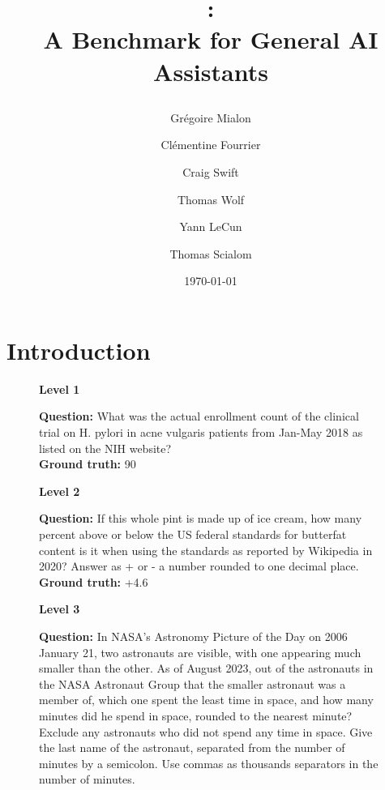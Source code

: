 \documentclass{fairmeta}
\title{
\begin{center}
    \benchmark{}: \\ A Benchmark for \textbf{G}eneral \textbf{AI} \textbf{A}ssistants
\end{center}
}
\author[1]{Gr\'egoire Mialon}
\author[2]{Cl\'ementine Fourrier}
\author[3]{Craig Swift}
\author[2]{Thomas Wolf}
\author[1]{Yann LeCun}
\author[4]{Thomas Scialom}
\affiliation[1]{FAIR, Meta}
\affiliation[2]{HuggingFace}
\affiliation[3]{AutoGPT}
\affiliation[4]{GenAI, Meta}
\date{\today}
\begin{document}
\maketitle


\section{Introduction}


\begin{figure}[h!]
    \centering
    \begin{tcolorbox}[colframe=RoyalBlue, colback=white]
    \begin{center}
    \textbf{\textcolor{lvl1}{Level 1}} 
    \end{center}
    \textbf{Question:}
    What was the actual enrollment count of the clinical trial on H. pylori in acne vulgaris patients from Jan-May 2018 as listed on the NIH website?
    \\
    \textbf{Ground truth:} 90
    \begin{center}
    \textbf{\textcolor{lvl2}{Level 2}} 
    \end{center}
    \begin{minipage}[c]{0.2\textwidth}
    \centering
    \end{minipage}
    \begin{minipage}[c]{0.79\textwidth}
        \textbf{Question:} If this whole pint is made up of ice cream, how many percent above or below the US federal standards for butterfat content is it when using the standards as reported by Wikipedia in 2020? Answer as + or - a number rounded to one decimal place. 
        \\
        \textbf{Ground truth:} +4.6 
    \end{minipage}
    \begin{center}
    \textbf{\textcolor{lvl3}{Level 3}} 
    \end{center}
    \textbf{Question:}
    In NASA's Astronomy Picture of the Day on 2006 January 21, two astronauts are visible, with one appearing much smaller than the other. As of August 2023, out of the astronauts in the NASA Astronaut Group that the smaller astronaut was a member of, which one spent the least time in space, and how many minutes did he spend in space, rounded to the nearest minute? Exclude any astronauts who did not spend any time in space. Give the last name of the astronaut, separated from the number of minutes by a semicolon. Use commas as thousands separators in the number of minutes. 

\end{tcolorbox}
\end{figure}
\end{document}
